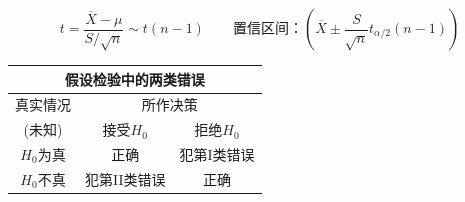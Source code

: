 \documentclass{article}
\begin{document}
\begin{tcolorbox}
\begin{itemize}
    \[t=\frac{\overline{X}-\mu}{S /\sqrt{n}} \sim t(n-1)\qquad\text{置信区间：}(\overline{X} \pm \frac{S}{\sqrt{n}}t_{\alpha/2}(n-1))\]
\end{itemize}
\begin{center}
\begin{tabular}{c|c|c}
    \hline
    \multicolumn{3}{c}{假设检验中的两类错误}\\ \hline
    真实情况&\multicolumn{2}{c}{所作决策} \\  \cline{2-3}
    (未知)&接受$H_0$&拒绝$H_0$ \\ \hline
    $H_0$为真&正确&犯第I类错误\\ \hline
    $H_0$不真&犯第II类错误&正确\\ \hline
\end{tabular}
\end{center}
\end{tcolorbox}
\clearpage
\end{document}
